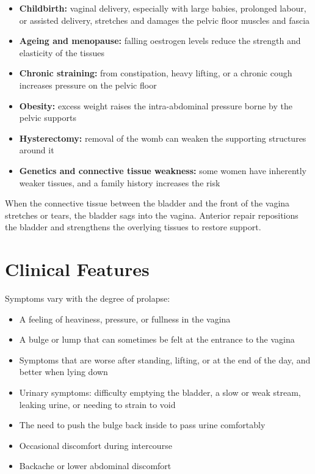 \begin{itemize}
    \item \textbf{Childbirth:} vaginal delivery, especially with large babies, prolonged labour, or assisted delivery, stretches and damages the pelvic floor muscles and fascia
    \item \textbf{Ageing and menopause:} falling oestrogen levels reduce the strength and elasticity of the tissues
    \item \textbf{Chronic straining:} from constipation, heavy lifting, or a chronic cough increases pressure on the pelvic floor
    \item \textbf{Obesity:} excess weight raises the intra-abdominal pressure borne by the pelvic supports
    \item \textbf{Hysterectomy:} removal of the womb can weaken the supporting structures around it
    \item \textbf{Genetics and connective tissue weakness:} some women have inherently weaker tissues, and a family history increases the risk
\end{itemize}

When the connective tissue between the bladder and the front of the vagina stretches or tears, the bladder sags into the vagina. Anterior repair repositions the bladder and strengthens the overlying tissues to restore support.

\section*{Clinical Features}
Symptoms vary with the degree of prolapse:

\begin{itemize}
    \item A feeling of heaviness, pressure, or fullness in the vagina
    \item A bulge or lump that can sometimes be felt at the entrance to the vagina
    \item Symptoms that are worse after standing, lifting, or at the end of the day, and better when lying down
    \item Urinary symptoms: difficulty emptying the bladder, a slow or weak stream, leaking urine, or needing to strain to void
    \item The need to push the bulge back inside to pass urine comfortably
    \item Occasional discomfort during intercourse
    \item Backache or lower abdominal discomfort
\end{itemize}

